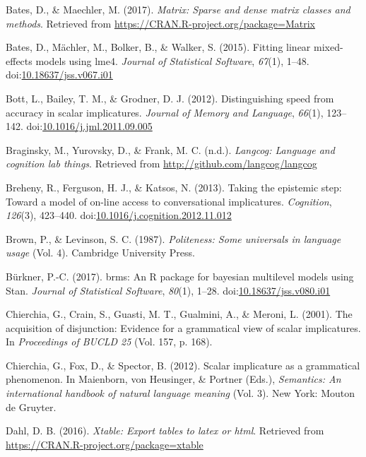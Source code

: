 \documentclass[man]{apa6}
\begin{document}
\hypertarget{ref-R-Matrix}{}
Bates, D., \& Maechler, M. (2017). \emph{Matrix: Sparse and dense matrix
classes and methods}. Retrieved from
\url{https://CRAN.R-project.org/package=Matrix}

\hypertarget{ref-R-lme4}{}
Bates, D., Mächler, M., Bolker, B., \& Walker, S. (2015). Fitting linear
mixed-effects models using lme4. \emph{Journal of Statistical Software},
\emph{67}(1), 1--48.
doi:\href{https://doi.org/10.18637/jss.v067.i01}{10.18637/jss.v067.i01}

\hypertarget{ref-bott2012}{}
Bott, L., Bailey, T. M., \& Grodner, D. J. (2012). Distinguishing speed
from accuracy in scalar implicatures. \emph{Journal of Memory and
Language}, \emph{66}(1), 123--142.
doi:\href{https://doi.org/10.1016/j.jml.2011.09.005}{10.1016/j.jml.2011.09.005}

\hypertarget{ref-R-langcog}{}
Braginsky, M., Yurovsky, D., \& Frank, M. C. (n.d.). \emph{Langcog:
Language and cognition lab things}. Retrieved from
\url{http://github.com/langcog/langcog}

\hypertarget{ref-breheny2013}{}
Breheny, R., Ferguson, H. J., \& Katsos, N. (2013). Taking the epistemic
step: Toward a model of on-line access to conversational implicatures.
\emph{Cognition}, \emph{126}(3), 423--440.
doi:\href{https://doi.org/10.1016/j.cognition.2012.11.012}{10.1016/j.cognition.2012.11.012}

\hypertarget{ref-brown1987}{}
Brown, P., \& Levinson, S. C. (1987). \emph{Politeness: Some universals
in language usage} (Vol. 4). Cambridge University Press.

\hypertarget{ref-R-brms}{}
Bürkner, P.-C. (2017). brms: An R package for bayesian multilevel models
using Stan. \emph{Journal of Statistical Software}, \emph{80}(1), 1--28.
doi:\href{https://doi.org/10.18637/jss.v080.i01}{10.18637/jss.v080.i01}

\hypertarget{ref-chierchia2001}{}
Chierchia, G., Crain, S., Guasti, M. T., Gualmini, A., \& Meroni, L.
(2001). The acquisition of disjunction: Evidence for a grammatical view
of scalar implicatures. In \emph{Proceedings of BUCLD 25} (Vol. 157, p.
168).

\hypertarget{ref-chierchia2012}{}
Chierchia, G., Fox, D., \& Spector, B. (2012). Scalar implicature as a
grammatical phenomenon. In Maienborn, von Heusinger, \& Portner (Eds.),
\emph{Semantics: An international handbook of natural language meaning}
(Vol. 3). New York: Mouton de Gruyter.

\hypertarget{ref-R-xtable}{}
Dahl, D. B. (2016). \emph{Xtable: Export tables to latex or html}.
Retrieved from \url{https://CRAN.R-project.org/package=xtable}
\end{document}
